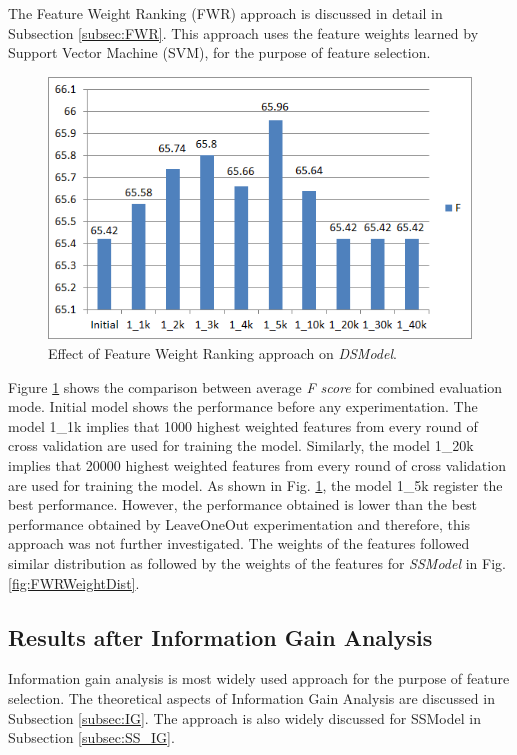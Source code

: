 The Feature Weight Ranking (FWR) approach is discussed in detail in Subsection \ref{subsec:FWR}. This approach uses the feature weights learned by Support Vector Machine (SVM), for the purpose of feature selection.

\begin{figure}
\centering
\includegraphics[scale=0.7]{figures/DSFWRResults.png}
\caption{Effect of Feature Weight Ranking approach on \textit{DSModel}.}\label{fig:DSFWR}
\end{figure}

Figure \ref{fig:DSFWR} shows the comparison between average \textit{F score} for combined evaluation mode. Initial model shows the performance before any experimentation. The model 1\_1k implies that 1000 highest weighted features from every round of cross validation are used for training the model. Similarly, the model 1\_20k implies that 20000 highest weighted features from every round of cross validation are used for training the model. As shown in Fig. \ref{fig:DSFWR}, the model 1\_5k register the best performance. However, the performance obtained is lower than the best performance obtained by LeaveOneOut experimentation and therefore, this approach was not further investigated. The weights of the features followed similar distribution as followed by the weights of the features for \textit{SSModel} in Fig. \ref{fig:FWRWeightDist}.

\subsection{Results after Information Gain Analysis}


Information gain analysis is most widely used approach for the purpose of feature selection. The theoretical aspects of Information Gain Analysis are discussed in Subsection \ref{subsec:IG}. The approach is also widely discussed for SSModel in Subsection \ref{subsec:SS_IG}.


